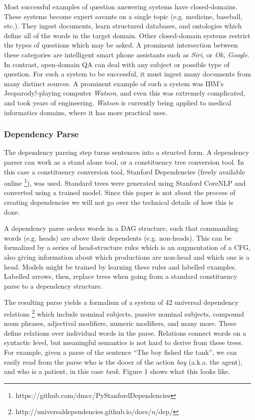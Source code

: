 \documentclass[twoside]{article}
\begin{document}
Most successful examples of question answering systems have closed-domains.  These systems become expert savants on a single topic (e.g. medicine, baseball, etc.).  They ingest documents, learn structured databases, and ontologies which define all of the words in the target domain.  Other closed-domain systems restrict the types of questions which may be asked.  A prominent intersection between these categories are intelligent smart phone assistants such as \textit{Siri}, or \textit{Ok, Google}.  In contrast, open-domain QA can deal with any subject or possible type of question.  For such a system to be successful, it must ingest many documents from many distinct sources. A prominent example of such a system was IBM's Jeoparody!-playing computer \textit{Watson}, and even this was extremely complicated, and took years of engineering.  \textit{Watson} is currently being applied to medical informatics domains, where it has more practical uses.

\subsubsection{Dependency Parse}

The dependency parsing step turns sentences into a structed form.  A dependency parser can work as a stand alone tool, or a constituency tree conversion tool.  In this case a constituency conversion tool, Stanford Dependencies (freely available online \footnote{https://github.com/dmcc/PyStanfordDependencies}), was used.  Standard trees were generated using Stanford CoreNLP and converted using a trained model.  Since this paper is not about the process of creating dependencies we will not go over the technical details of how this is done.

A dependency parse orders words in a DAG structure, such that commanding words (e.g. heads) are above their dependents (e.g. non-heads).  This can be formalized by a series of head-structure rules which is an augmentation of a CFG, also giving information about which productions are non-head and which one is a head.  Models might be trained by learning these rules and labelled examples.  Labelled arrows, then, replace trees when going from a standard constituency parse to a dependency structure.

The resulting parse yields a formalism of a system of 42 universal dependency relations \footnote{http://universaldependencies.github.io/docs/u/dep/} which include nominal subjects, passive nominal subjects, compound noun phrases, adjectival modifiers, numeric modifiers, and many more.  These define relations over individual words in the parse.  Relations connect words on a syntactic level, but meaningful semantics is not hard to derive from these trees.  For example, given a parse of the sentence ``The boy fished the tank'', we can easily read from the parse who is the dooer of the action \textit{boy} (a.k.a. the agent), and who is a patient, in this case \textit{tank}.  Figure 1 shows what this looks like.
\end{document}
